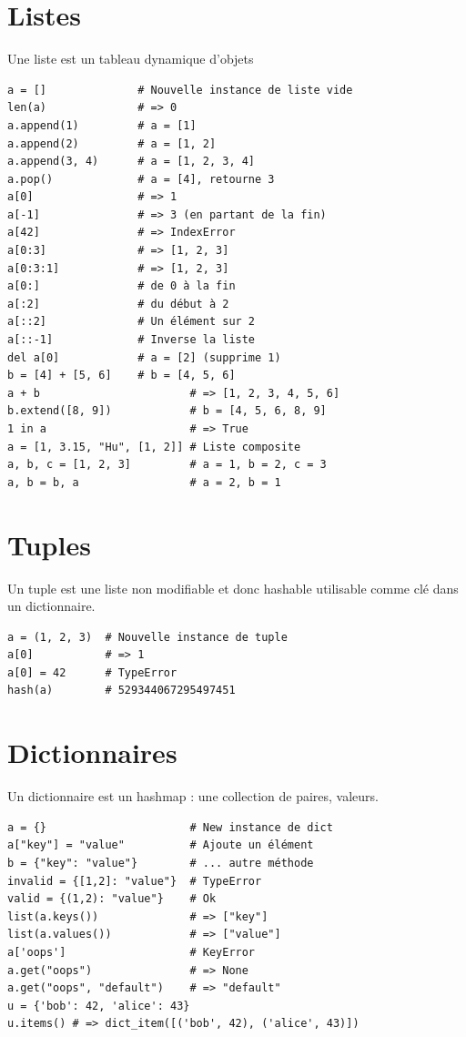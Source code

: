 \documentclass{article}
\begin{document}
\begin{multicols*}{4}
\section*{Listes}
Une liste est un tableau dynamique d'objets
\begin{lstlisting}
a = []              # Nouvelle instance de liste vide
len(a)              # => 0
a.append(1)         # a = [1]
a.append(2)         # a = [1, 2]
a.append(3, 4)      # a = [1, 2, 3, 4]
a.pop()             # a = [4], retourne 3
a[0]                # => 1
a[-1]               # => 3 (en partant de la fin)
a[42]               # => IndexError
a[0:3]              # => [1, 2, 3]
a[0:3:1]            # => [1, 2, 3]
a[0:]               # de 0 à la fin
a[:2]               # du début à 2
a[::2]              # Un élément sur 2
a[::-1]             # Inverse la liste
del a[0]            # a = [2] (supprime 1)
b = [4] + [5, 6]    # b = [4, 5, 6]
a + b                       # => [1, 2, 3, 4, 5, 6]
b.extend([8, 9])            # b = [4, 5, 6, 8, 9]
1 in a                      # => True
a = [1, 3.15, "Hu", [1, 2]] # Liste composite
a, b, c = [1, 2, 3]         # a = 1, b = 2, c = 3
a, b = b, a                 # a = 2, b = 1
\end{lstlisting}

\section*{Tuples}
Un tuple est une liste non modifiable et donc hashable utilisable comme clé dans un dictionnaire.
\begin{lstlisting}
a = (1, 2, 3)  # Nouvelle instance de tuple
a[0]           # => 1
a[0] = 42      # TypeError
hash(a)        # 529344067295497451
\end{lstlisting}

\section*{Dictionnaires}
Un dictionnaire est un hashmap : une collection de paires, valeurs.
\begin{lstlisting}
a = {}                      # New instance de dict
a["key"] = "value"          # Ajoute un élément
b = {"key": "value"}        # ... autre méthode
invalid = {[1,2]: "value"}  # TypeError
valid = {(1,2): "value"}    # Ok
list(a.keys())              # => ["key"]
list(a.values())            # => ["value"]
a['oops']                   # KeyError
a.get("oops")               # => None
a.get("oops", "default")    # => "default"
u = {'bob': 42, 'alice': 43}
u.items() # => dict_item([('bob', 42), ('alice', 43)])
\end{lstlisting}


\end{multicols*}
\end{document}
